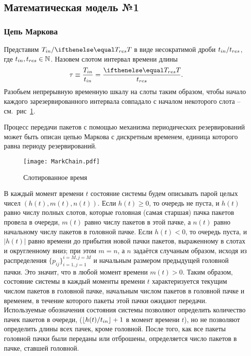 \subsection{Математическая модель №1}
\label{subsec:mathmodel_1}

\subsubsection{Цепь Маркова}
\label{subsubsec:markovchain_1}
Представим $\Tin/\Tres$ в виде несократимой дроби $t_{in}/t_{res}$, где $t_{in}, t_{res}\in\mathbb{N}$. Назовем слотом интервал времени длины $$\tau \equiv  \frac{\Tin}{\tin} = \frac{\Tres}{\tres}.$$ Разобьем непрерывную временную шкалу на слоты таким образом, чтобы начало каждого зарезервированного интервала совпадало с началом некоторого слота -- см.~рис~\ref{fig:time}.

Процесс передачи пакетов с помощью механизма периодических резервирований может быть описан цепью Маркова с дискретным временем, единица которого равна периоду резервирований.

\begin{figure}[t]
\texttt{[image: MarkChain.pdf]}
\caption{\label{fig:time} Слотированное время}
\end{figure} 

В каждый момент времени $t$ состояние системы будем описывать парой целых чисел $(h(t), m(t), n(t))$. Если $h(t) \geqslant 0$, то очередь не пуста, и $h(t)$ равно числу полных слотов, которые головная (самая старшая) пачка пакетов провела в очереди, $m(t)$ равно числу пакетов в этой пачке, а $n(t)$ равно начальному числу пакетов в головной пачке. Если $h(t) < 0$, то очередь пуста, и $|h(t)|$ равно времени до прибытия новой пачки пакетов, выраженному в слотах и округленному вниз; при этом $m=n$, а $n$ задаётся случаным образом, исходя из распределения $\{ p_{ij} \}_{i=1, j=1}^{i=M, j=M}$ и начальным размером предыдущей головной пачки. Это значит, что в любой момент времени $m(t) > 0$. Таким образом, состояние системы в каждый моменты времени $t$ характеризуется текущим числом пакетов в головной пачке, начальным числом пакетов  в головной пачке и временем, в течение которого пакеты этой пачки ожидают передачи. Используемые обозначения состояния системы позволяют определить количество пачек пакетов в очереди, ($\lfloor h(t)/t_{in} \rfloor + 1$ в момент времени $t$), но не позволяют определить длины всех пачек, кроме головной. После того, как все пакеты головной пачки были переданы или отброшены, определяется число пакетов в пачке, ставшей головной.
  
